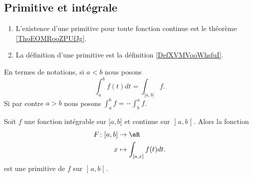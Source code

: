 
\subsection{Primitive et intégrale}

\begin{enumerate}
    \item
        L'existence d'une primitive pour toute fonction continue est le théorème \ref{ThoEOMRooZPUfJg}.
    \item
        La définition d'une primitive est la définition \ref{DefXVMVooWhsfuI}.
\end{enumerate}

En termes de notations, si \( a<b\) nous posons
\begin{equation}
    \int_a^bf(t)dt=\int_{\mathopen[ a , b \mathclose]}f.
\end{equation}
Si par contre \( a>b\) nous posons \( \int_a^bf=-\int_b^af\).

\begin{proposition} \label{PropEZFRsMj}
    Soit \( f\) une fonction intégrable sur \( \mathopen[ a , b \mathclose]\) et continue sur \( \mathopen] a , b \mathclose[\). Alors la fonction
    \begin{equation}
        \begin{aligned}
            F\colon \mathopen[ a , b \mathclose]&\to \eR \\
            x&\mapsto \int_{\mathopen[ a , x \mathclose]}f(t)dt.
        \end{aligned}
    \end{equation}
est une primitive de \( f\) sur \( \mathopen] a , b \mathclose[\).
\end{proposition}

